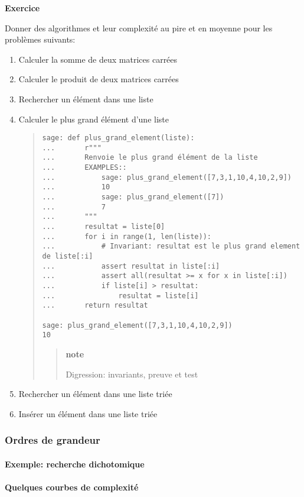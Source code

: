 \textbf{Exercice}

Donner des algorithmes et leur complexité au pire et en moyenne pour les
problèmes suivants:

\begin{enumerate}
\item
  Calculer la somme de deux matrices carrées
\item
  Calculer le produit de deux matrices carrées
\item
  Rechercher un élément dans une liste
\item
  Calculer le plus grand élément d'une liste

  \begin{quote}
\begin{verbatim}
sage: def plus_grand_element(liste):
...       r"""
...       Renvoie le plus grand élément de la liste
...       EXAMPLES::
...           sage: plus_grand_element([7,3,1,10,4,10,2,9])
...           10
...           sage: plus_grand_element([7])
...           7
...       """
...       resultat = liste[0]
...       for i in range(1, len(liste)):
...           # Invariant: resultat est le plus grand element de liste[:i]
...           assert resultat in liste[:i]
...           assert all(resultat >= x for x in liste[:i])
...           if liste[i] > resultat:
...               resultat = liste[i]
...       return resultat

sage: plus_grand_element([7,3,1,10,4,10,2,9])
10
\end{verbatim}

  \begin{quote}
  \textbf{note}

  Digression: invariants, preuve et test
  \end{quote}
  \end{quote}
\item
  Rechercher un élément dans une liste triée
\item
  Insérer un élément dans une liste triée
\end{enumerate}

\subsubsection{Ordres de grandeur}

\paragraph{Exemple: recherche dichotomique}

\paragraph{Quelques courbes de complexité}

